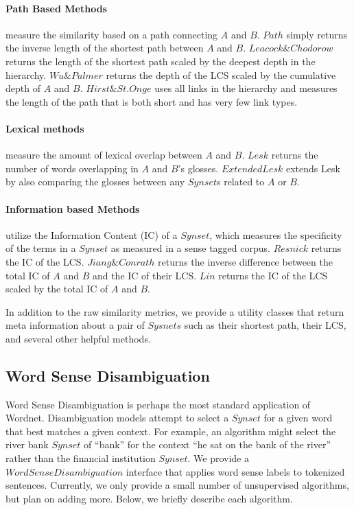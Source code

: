 \documentclass[a4paper,11pt]{article}
\begin{document}
\paragraph{Path Based Methods} measure the similarity based on a path connecting $A$ and $B$.  $Path$ simply returns the inverse length of the shortest path between $A$ and $B$.  $Leacock \& Chodorow$ \cite{Leacock98sim} returns the length of the shortest path scaled by the deepest depth in the hierarchy.  $Wu \& Palmer$ \cite{wu94sim} returns the depth of the LCS scaled by the cumulative depth of $A$ and $B$.  $Hirst \& St. Onge$ \cite{hirst97lexical} uses all links in the hierarchy and measures the length of the path that is both short and has very few link types.

\paragraph{Lexical methods} measure the amount of lexical overlap between $A$ and $B$.  $Lesk$ \cite{lesk86wsd} returns the number of words overlapping in $A$ and $B$'s glosses.  $ExtendedLesk$ \cite{banerjee03extlesk} extends Lesk by also comparing the glosses between any $Synset$s related to $A$ or $B$.

\paragraph{Information based Methods} utilize the Information Content (IC) of a $Synset$, which measures the specificity of the terms in a $Synset$ as measured in a sense tagged corpus.  $Resnick$ \cite{Resnik95sim} returns the IC of the LCS.  $Jiang \& Conrath$ \cite{jiang97taxonomySimilarity} returns the inverse difference between the total IC of $A$ and $B$ and the IC of their LCS.  $Lin$ \cite{Lin98sim} returns the IC of the LCS scaled by the total IC of $A$ and $B$.

In addition to the raw similarity metrics, we provide a utility classes that return
meta information about a pair of $Sysnets$ such as their shortest path, their
LCS, and several other helpful methods.

\subsection{Word Sense Disambiguation}

Word Sense Disambiguation is perhaps the most standard application of Wordnet.  Disambiguation models attempt to select a $Synset$ for a given word that best matches a given context.  For example, an algorithm might select the river bank $Synset$ of  ``bank'' for the context ``he sat on the bank of the river'' rather than the financial institution $Synset$.  We provide a $WordSenseDisambiguation$ interface that applies word sense labels to tokenized sentences.  Currently, we only provide a small number of unsupervised algorithms, but plan on adding more.  Below, we briefly describe each algorithm.
\end{document}
